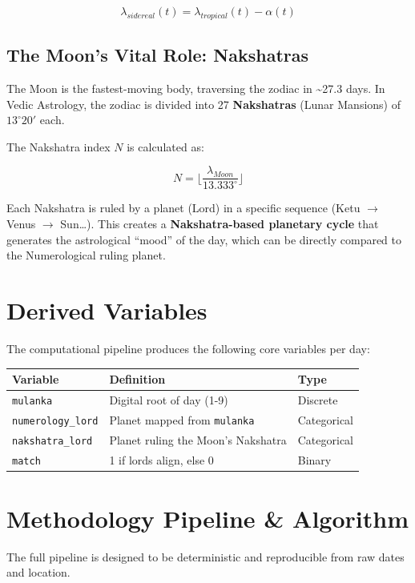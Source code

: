 \documentclass[
  11pt,
  a4paper,
  oneside,
  openany]{report}
\begin{document}
\[
\lambda_{sidereal}(t) = \lambda_{tropical}(t) - \alpha(t)
\]

\subsection{The Moon's Vital Role:
Nakshatras}\label{the-moons-vital-role-nakshatras}

The Moon is the fastest-moving body, traversing the zodiac in
\textasciitilde27.3 days. In Vedic Astrology, the zodiac is divided into
27 \textbf{Nakshatras} (Lunar Mansions) of \(13^\circ 20'\) each.

The Nakshatra index \(N\) is calculated as:

\[
N = \lfloor \frac{\lambda_{Moon}}{13.333^\circ} \rfloor
\]

Each Nakshatra is ruled by a planet (Lord) in a specific sequence (Ketu
\(\to\) Venus \(\to\) Sun\ldots). This creates a \textbf{Nakshatra-based
planetary cycle} that generates the astrological ``mood'' of the day,
which can be directly compared to the Numerological ruling planet.

\section{Derived Variables}\label{derived-variables}

The computational pipeline produces the following core variables per
day:

\begin{longtable}[]{@{}lll@{}}
\toprule\noalign{}
Variable & Definition & Type \\
\midrule\noalign{}
\endhead
\bottomrule\noalign{}
\endlastfoot
\texttt{mulanka} & Digital root of day (1-9) & Discrete \\
\texttt{numerology\_lord} & Planet mapped from \texttt{mulanka} &
Categorical \\
\texttt{nakshatra\_lord} & Planet ruling the Moon's Nakshatra &
Categorical \\
\texttt{match} & 1 if lords align, else 0 & Binary \\
\end{longtable}

\section{Methodology Pipeline \&
Algorithm}\label{methodology-pipeline-algorithm}

The full pipeline is designed to be deterministic and reproducible from
raw dates and location.
\end{document}
